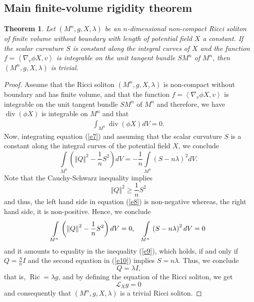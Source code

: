 \documentclass[a4paper, twoside, 10pt]{article}
\numberwithin{equation}{section}
\newtheorem{theorem}{Theorem}[section]
\theoremstyle{definition}
\begin{document}
\subsection{Main finite-volume rigidity theorem}


\begin{theorem}\label{main}
Let $\left( M^{n},g,X,\lambda \right) $ be an $n$-dimensional non-compact
Ricci soliton of finite volume without boundary with length of potential field $X$ a constant. If the scalar curvature $S$ is constant along the
integral curves of $X$ and the function $f=\left\langle \nabla _{v}\phi
X,v\right\rangle $ is integrable on the unit tangent bundle $SM^{n}$ of $
M^{n}$, then $\left( M^{n},g,X,\lambda \right) $ is trivial.
\end{theorem}


\begin{proof}
    Assume that the Ricci soliton $\left(M^{n},g,X,\lambda \right)$ is
non-compact without boundary and has finite volume, and that the function 
$f=\left\langle \nabla _{v}\phi X,v\right \rangle$ is integrable on the unit
tangent bundle $SM^{n}$ of $M^{n}$ and therefore, we have 
$\operatorname{div}\left(\phi X \right)$ is integrable on $M^{n}$ and that
\begin{eqnarray*}
\int_{M^{n}}\operatorname{div} \left(\phi X\right)dV =0.
\end{eqnarray*}
Now, integrating equation (\ref{e7}) and assuming that the scalar curvature $S$
is a constant along the integral curves of the potential field $X$, we
conclude
\begin{equation}\label{e8}
\int\limits_{M^{n}}\left( \left\Vert Q\right\Vert ^{2}-\frac{1}{n}
S^{2}\right) dV=-\frac{1}{n}\int\limits_{M^{n}}\left(S-n\lambda \right)
^{2}dV\text{.}  
\end{equation}
Note that the Cauchy-Schwarz inequality implies
\begin{equation}\label{e9}
\left\Vert Q\right\Vert ^{2}\geq \frac{1}{n}S^{2}  
\end{equation}
and thus, the left hand side in equation (\ref{e8}) is non-negative whereas, the
right hand side, it is non-positive. Hence, we conclude
\begin{equation}\label{e10}
\int \limits_{M^{n}}\left(\left\Vert Q\right\Vert ^{2}-\frac{1}{n} S^{2}\right) dV=0\text{,\quad }\int\limits_{M^{n}}\left( S-n\lambda \right)
^{2}dV=0  
\end{equation}
and it amounts to equality in the inequality (\ref{e9}), which holds, if and only
if $Q=\frac{S}{n}I$ and the second equation in (\ref{e10}) implies $S=n\lambda $.
Thus, we conclude
\[
Q=\lambda I\text{,} 
\]%
that is, $\operatorname{Ric}=\lambda g$, and by defining the equation of the Ricci soliton, we get
\[
\mathcal{L} _{X}g=0 
\]
and consequently that $\left( M^{n},g,X,\lambda \right) $ is a trivial Ricci
soliton.
\end{proof}
\end{document}
